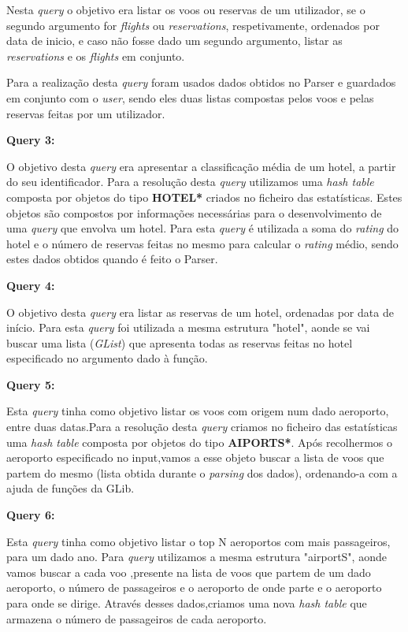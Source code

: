 \documentclass[12pt,a4paper]{report}
\begin{document}
     \par Nesta \textit{query} o objetivo era listar os voos ou reservas de um utilizador, se o segundo argumento for \textit{flights} ou \textit{reservations}, respetivamente, ordenados por data de inicio, e caso não fosse dado um segundo argumento, listar as \textit{reservations} e os \textit{flights} em conjunto.
     \par Para a realização desta \textit{query} foram usados dados obtidos no Parser e guardados em conjunto com o \textit{user}, sendo eles duas listas compostas pelos voos e pelas reservas feitas por um utilizador.
\newpage
     \par \textbf{Query 3:}
     \par O objetivo desta \textit{query}  era apresentar a classificação média de um hotel, a partir do seu identificador.
        Para a resolução desta \textit{query} utilizamos uma \textit{hash table} composta por objetos do tipo \textbf{HOTEL*} criados no ficheiro das estatísticas. Estes objetos são compostos por informações necessárias para o desenvolvimento de uma \textit{query} que envolva um hotel. Para esta \textit{query} é utilizada a soma do \textit{rating} do hotel e o número de reservas feitas no mesmo para calcular o \textit{rating} médio, sendo estes dados obtidos quando é feito o Parser.


    \textbf{Query 4:}
     \par  O objetivo desta \textit{query} era listar as reservas de um hotel, ordenadas por data de início.
        Para esta \textit{query} foi utilizada a mesma estrutura  "hotel", aonde se vai buscar uma lista (\textit{GList}) que apresenta todas as reservas feitas no hotel especificado no argumento dado à função.

     \textbf{Query 5:}
     \par Esta \textit{query} tinha como objetivo listar os voos com origem num dado aeroporto, entre duas datas.Para a resolução desta \textit{query} criamos no ficheiro das estatísticas uma \textit{hash table} composta por objetos do tipo \textbf{AIPORTS*}.
     Após recolhermos o aeroporto especificado no input,vamos a esse objeto buscar a lista de voos que partem do mesmo (lista obtida durante o \textit{parsing} dos dados), ordenando-a com a ajuda de funções da GLib.

     \textbf{Query 6:}
     \par Esta \textit{query} tinha como objetivo listar o top N aeroportos com mais passageiros, para um dado ano. Para \textit{query} utilizamos a mesma estrutura "airportS", aonde vamos buscar a cada voo ,presente na lista de voos que partem de um dado aeroporto,  o número de passageiros e o aeroporto de onde parte e o aeroporto para onde se dirige. Através desses dados,criamos uma nova \textit{hash table} que armazena o número de passageiros de cada aeroporto.
\end{document}

